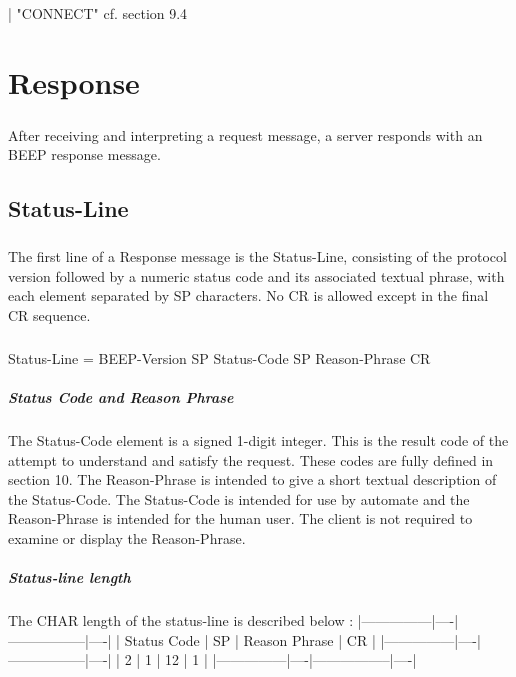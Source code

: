         \paragraph{}
                | "CONNECT"                cf. section 9.4


    \clearpage
\chapter{Response}
    \paragraph{}
After receiving and interpreting a request message, a server responds
with an BEEP response message.
    \section{Status-Line}
        \paragraph{}
The first line of a Response message is the Status-Line, consisting
of the protocol version followed by a numeric status code and its
associated textual phrase, with each element separated by SP
characters. No CR is allowed except in the final CR sequence.
        \paragraph{}
Status-Line = BEEP-Version SP Status-Code SP Reason-Phrase CR
        \paragraph{Status Code and Reason Phrase}
The Status-Code element is a signed 1-digit integer. This is the
result code of the attempt to understand and satisfy the request.
These codes are fully defined in section 10. The Reason-Phrase is
intended to give a short textual description of the Status-Code. The
Status-Code is intended for use by automate and the Reason-Phrase is
intended for the human user. The client is not required to examine or
display the Reason-Phrase.
        \paragraph{Status-line length}
The CHAR length of the status-line is described below :
|---------------|----|-----------------|----|
| {Status Code} | SP | {Reason Phrase} | CR |
|---------------|----|-----------------|----|
|       2       |  1 |        12       |  1 |
|---------------|----|-----------------|----|

